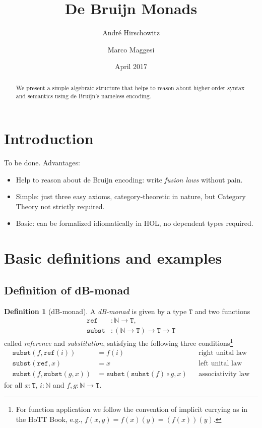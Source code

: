 \documentclass[a4paper,twoside,12pt]{article}
\title{De Bruijn Monads}
\author{Andr\'e Hirschowitz \and Marco Maggesi}
\date{April 2017}
\theoremstyle{definition}
\newtheorem{definition}{Definition}
\theoremstyle{remark}
\newcommand{\NN}{\mathbb{N}}
\newcommand{\subst}{\mathtt{subst}}
\newcommand{\refe}{\mathtt{ref}}
\newcommand{\TT}{\mathtt{T}}
\begin{document}
\maketitle

\begin{abstract}
  We present a simple algebraic structure that helps to reason about
  higher-order syntax and semantics using de Bruijn's nameless
  encoding.
\end{abstract}

\section{Introduction}
\label{sec:intro}
To be done.
Advantages:
\begin{itemize}
\item Help to reason about de Bruijn encoding: write \emph{fusion
    laws} without pain.
\item Simple: just three easy axioms, category-theoretic in nature,
  but Category Theory not strictly required.
\item Basic: can be formalized idiomatically in HOL, no dependent
  types required.
\end{itemize}

\section{Basic definitions and examples}
\label{sec:basic-def}

\subsection{Definition of dB-monad}
\label{sec:basic-defin-example}

\begin{definition}[dB-monad]
  A \emph{dB-monad} is given by a type $\TT$ and two functions
  \begin{align*}
    \refe &\colon \NN \to \TT, \\
    \subst &\colon (\NN \to \TT) \to \TT \to \TT
  \end{align*}
  called \emph{reference} and \emph{substitution}, satisfying the
  following three conditions\footnote{For function application we
    follow the convention of implicit currying as in the HoTT Book,
    e.g., $f(x,y) = f(x)(y) = (f(x))(y)$.}
  \begin{align*}
    \subst(f,\refe(i)) &=  f(i)
    && \text{right unital law} \\
    \subst(\refe, x) &=  x
    && \text{left unital law} \\
    \subst(f, \subst(g, x)) &= \subst(\subst(f) \circ g, x)
    &&\text{associativity law}
  \end{align*}
  for all $x : \TT$, $i :\NN$ and $f,g\colon \NN \to \TT$.
\end{definition}
\end{document}
